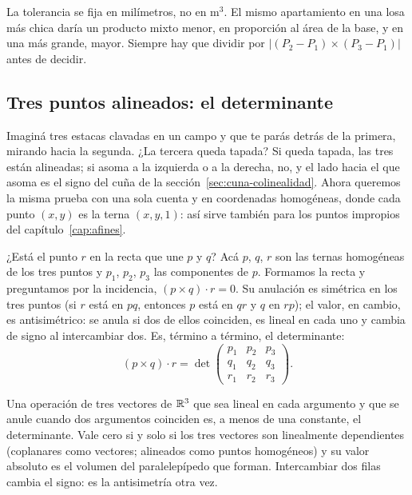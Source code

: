 \begin{atencion}
La tolerancia se fija en milímetros, no en m\(^3\). El mismo apartamiento en una losa más
chica daría un producto mixto menor, en proporción al área de la base, y en una más grande,
mayor. Siempre hay que dividir por \(\lvert(P_2-P_1)\times(P_3-P_1)\rvert\)
antes de decidir.
\end{atencion}

\subsection{Tres puntos alineados: el determinante}\label{sec:determinante}

Imaginá tres estacas clavadas en un campo y que te parás detrás de la primera, mirando hacia
la segunda. ¿La tercera queda tapada?
Si queda tapada, las tres están alineadas; si asoma a la izquierda o a la derecha, no, y el
lado hacia el que asoma es el signo del cuña de la sección~\ref{sec:cuna-colinealidad}. Ahora
queremos la misma prueba con una sola cuenta y en coordenadas homogéneas, donde cada punto
\((x,y)\) es la terna \((x,y,1)\): así sirve también para los puntos impropios del
capítulo~\ref{cap:afines}.

¿Está el punto \(r\) en la recta que une \(p\) y \(q\)? Acá \(p\), \(q\), \(r\) son las ternas
homogéneas de los tres puntos y \(p_1\), \(p_2\), \(p_3\) las componentes de \(p\). Formamos la
recta y preguntamos por la incidencia, \((p\times q)\cdot r=0\). Su anulación es simétrica en los tres puntos (si \(r\) está en \(pq\), entonces \(p\) está
en \(qr\) y \(q\) en \(rp\)); el valor, en cambio, es antisimétrico: se anula si dos de
ellos coinciden, es lineal en cada uno y cambia de signo al intercambiar dos. Es, término a
término, el determinante:
\[
  (p\times q)\cdot r=\det\begin{pmatrix}p_1&p_2&p_3\\q_1&q_2&q_3\\r_1&r_2&r_3\end{pmatrix}.
\]

\begin{resultado}
Una operación de tres vectores de \(\mathbb{R}^3\) que sea lineal en cada argumento y que se anule
cuando dos argumentos coinciden es, a menos de una constante, el determinante. Vale cero
si y solo si los tres vectores son linealmente dependientes (coplanares como vectores;
alineados como puntos homogéneos) y su valor absoluto es el volumen del paralelepípedo que
forman. Intercambiar dos filas cambia el signo: es la antisimetría otra vez.
\end{resultado}

